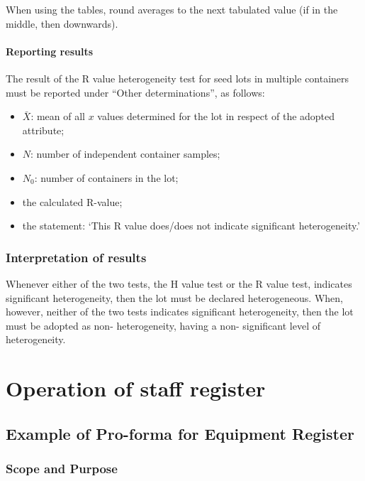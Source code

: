 \documentclass[]{book}
\providecommand{\tightlist}{%
  \setlength{\itemsep}{0pt}\setlength{\parskip}{0pt}}
\begin{document}
When using the tables, round averages to the next tabulated value (if in
the middle, then downwards).

\subsubsection{Reporting results}\label{reporting-results-1}

The result of the R value heterogeneity test for seed lots in multiple
containers must be reported under ``Other determinations'', as follows:

\begin{itemize}
\tightlist
\item
  \(\bar{X}\): mean of all \(x\) values determined for the lot in
  respect of the adopted attribute;
\item
  \(N\): number of independent container samples;
\item
  \(N_0\): number of containers in the lot;
\item
  the calculated R-value;
\item
  the statement: `This R value does/does not indicate significant
  heterogeneity.'
\end{itemize}

\subsection{Interpretation of results}\label{interpretation-of-results}

Whenever either of the two tests, the H value test or the R value test,
indicates significant heterogeneity, then the lot must be declared
heterogeneous. When, however, neither of the two tests indicates
significant heterogeneity, then the lot must be adopted as non-
heterogeneity, having a non- significant level of heterogeneity.

\chapter{Operation of staff register}\label{operation-of-staff-register}

\section{Example of Pro-forma for Equipment
Register}\label{example-of-pro-forma-for-equipment-register}

\subsection{Scope and Purpose}\label{scope-and-purpose-1}
\end{document}
